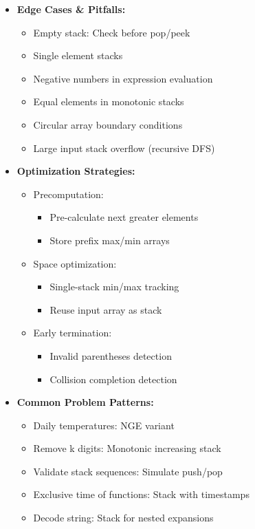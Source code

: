 \documentclass[a4paper,10pt]{book}
\begin{document}
\begin{itemize}
    \item \textbf{Edge Cases \& Pitfalls:}
    \begin{itemize}
        \item Empty stack: Check before pop/peek
        \item Single element stacks
        \item Negative numbers in expression evaluation
        \item Equal elements in monotonic stacks
        \item Circular array boundary conditions
        \item Large input stack overflow (recursive DFS)
    \end{itemize}
    
    \item \textbf{Optimization Strategies:}
    \begin{itemize}
        \item Precomputation:
        \begin{itemize}
            \item Pre-calculate next greater elements
            \item Store prefix max/min arrays
        \end{itemize}
        \item Space optimization:
        \begin{itemize}
            \item Single-stack min/max tracking
            \item Reuse input array as stack
        \end{itemize}
        \item Early termination:
        \begin{itemize}
            \item Invalid parentheses detection
            \item Collision completion detection
        \end{itemize}
    \end{itemize}
    
    \item \textbf{Common Problem Patterns:}
    \begin{itemize}
        \item Daily temperatures: NGE variant
        \item Remove k digits: Monotonic increasing stack
        \item Validate stack sequences: Simulate push/pop
        \item Exclusive time of functions: Stack with timestamps
        \item Decode string: Stack for nested expansions
    \end{itemize}
    

\end{itemize}
\end{document}
